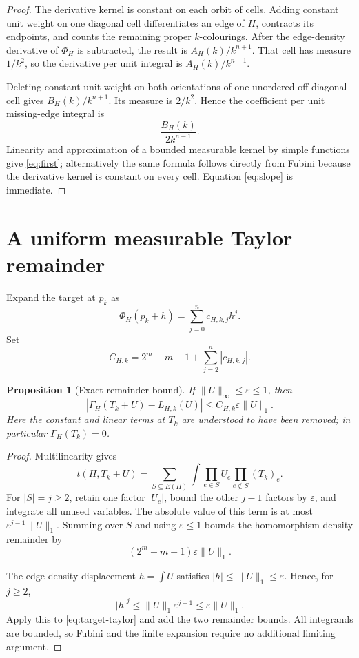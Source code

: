 \documentclass[11pt]{article}
\newtheorem{proposition}[theorem]{Proposition}
\begin{document}
\begin{proof}
The derivative kernel is constant on each orbit of cells.  Adding constant
unit weight on one diagonal cell differentiates an edge of $H$, contracts
its endpoints, and counts the remaining proper $k$-colourings.  After the
edge-density derivative of $\Phi_H$ is subtracted, the result is
$A_H(k)/k^{n+1}$.  That cell has measure $1/k^2$, so the derivative per unit
integral is $A_H(k)/k^{n-1}$.

Deleting constant unit weight on both orientations of one unordered
off-diagonal cell gives $B_H(k)/k^{n+1}$.  Its measure is $2/k^2$.  Hence the
coefficient per unit missing-edge integral is
\[
 \frac{B_H(k)}{2k^{n-1}}.
\]
Linearity and approximation of a bounded measurable kernel by simple
functions give \eqref{eq:first}; alternatively the same formula follows
directly from Fubini because the derivative kernel is constant on every
cell.  Equation \eqref{eq:slope} is immediate.
\end{proof}

\section{A uniform measurable Taylor remainder}

Expand the target at $p_k$ as
\begin{equation}
 \Phi_H(p_k+h)=\sum_{j=0}^n c_{H,k,j}h^j.
 \label{eq:target-taylor}
\end{equation}
Set
\begin{equation}
 C_{H,k}=2^m-m-1+\sum_{j=2}^n|c_{H,k,j}|.
 \label{eq:C}
\end{equation}

\begin{proposition}[Exact remainder bound]
\label{prop:remainder}
If $\lVert U\rVert_\infty\leq\varepsilon\leq1$, then
\begin{equation}
 \left|
 \Gamma_H(T_k+U)-L_{H,k}(U)
 \right|
 \leq C_{H,k}\varepsilon\lVert U\rVert_1.
 \label{eq:remainder}
\end{equation}
Here the constant and linear terms at $T_k$ are understood to have been
removed; in particular $\Gamma_H(T_k)=0$.
\end{proposition}

\begin{proof}
Multilinearity gives
\[
 t(H,T_k+U)=
 \sum_{S\subseteq E(H)}
 \int\prod_{e\in S}U_e\prod_{e\notin S}(T_k)_e.
\]
For $|S|=j\geq2$, retain one factor $|U_e|$, bound the other $j-1$ factors
by $\varepsilon$, and integrate all unused variables.  The absolute value
of this term is at most
$\varepsilon^{j-1}\lVert U\rVert_1$.  Summing over $S$ and using
$\varepsilon\leq1$ bounds the homomorphism-density remainder by
\[
 (2^m-m-1)\varepsilon\lVert U\rVert_1.
\]

The edge-density displacement $h=\int U$ satisfies
$|h|\leq\lVert U\rVert_1\leq\varepsilon$.  Hence, for $j\geq2$,
\[
 |h|^j\leq\lVert U\rVert_1\varepsilon^{j-1}
 \leq\varepsilon\lVert U\rVert_1.
\]
Apply this to \eqref{eq:target-taylor} and add the two remainder bounds.
All integrands are bounded, so Fubini and the finite expansion require no
additional limiting argument.
\end{proof}
\end{document}
